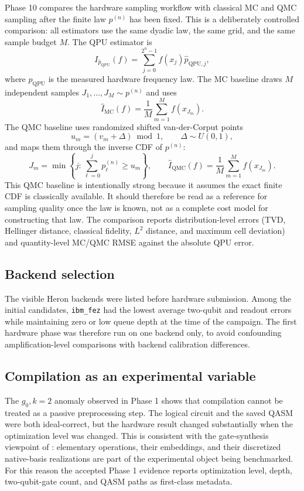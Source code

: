 Phase 10 compares the hardware sampling workflow with classical MC and QMC
sampling after the finite law \(p^{(n)}\) has been fixed. This is a deliberately
controlled comparison: all estimators use the same dyadic law, the same grid,
and the same sample budget \(M\). The QPU estimator is
\[
  I_{\hat p_{\mathrm{QPU}}}(f)
  =
  \sum_{j=0}^{2^n-1}f(x_j)\hat p_{\mathrm{QPU},j},
\]
where \(\hat p_{\mathrm{QPU}}\) is the measured hardware frequency law. The MC
baseline draws \(M\) independent samples \(J_1,\ldots,J_M\sim p^{(n)}\) and
uses
\[
  \hat I_{\mathrm{MC}}(f)
  =
  \frac{1}{M}\sum_{m=1}^M f(x_{J_m}).
\]
The QMC baseline uses randomized shifted van-der-Corput points
\[
  u_m=(v_m+\Delta)\bmod 1,\qquad \Delta\sim U(0,1),
\]
and maps them through the inverse CDF of \(p^{(n)}\):
\[
  J_m=\min\left\{j:\sum_{\ell=0}^j p^{(n)}_\ell\ge u_m\right\},
  \qquad
  \hat I_{\mathrm{QMC}}(f)
  =
  \frac{1}{M}\sum_{m=1}^M f(x_{J_m}).
\]
This QMC baseline is intentionally strong because it assumes the exact finite
CDF is classically available. It should therefore be read as a reference for
sampling quality once the law is known, not as a complete cost model for
constructing that law. The comparison reports distribution-level errors
(TVD, Hellinger distance, classical fidelity, \(L^2\) distance, and maximum cell
deviation) and quantity-level MC/QMC RMSE against the absolute QPU error.

\subsection{Backend selection}

The visible Heron backends were listed before hardware submission. Among the
initial candidates, \texttt{ibm\_fez} had the lowest average two-qubit and
readout errors while maintaining zero or low queue depth at the time of the
campaign. The first hardware phase was therefore run on one backend only, to
avoid confounding amplification-level comparisons with backend calibration
differences.

\subsection{Compilation as an experimental variable}

The \(g_0,k=2\) anomaly observed in Phase 1 shows that compilation cannot be
treated as a passive preprocessing step. The logical circuit and the saved QASM
were both ideal-correct, but the hardware result changed substantially when the
optimization level was changed. This is consistent with the gate-synthesis
viewpoint of \cite{falco2026liegates}: elementary operations, their embeddings,
and their discretized native-basis realizations are part of the experimental
object being benchmarked. For this reason the accepted Phase 1 evidence reports
optimization level, depth, two-qubit-gate count, and QASM paths as first-class
metadata.

